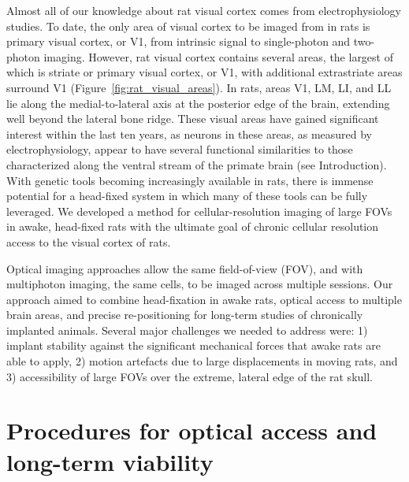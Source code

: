 Almost all of our knowledge about rat visual cortex comes from electrophysiology studies. To date, the only area of visual cortex to be imaged from in rats is primary visual cortex, or V1, from intrinsic signal \cite{Gias2004} to single-photon \cite{Scott2018ImagingMacroscope} and two-photon \cite{Ohki2005, Greenberg2008} imaging. However, rat visual cortex contains several areas, the largest of which is striate or primary visual cortex, or V1, with additional extrastriate areas surround V1 \cite{Espinoza1983RetinotopicRat, Sereno1991} (Figure~\ref{fig:rat_visual_areas}). In rats, areas V1, LM, LI, and LL lie along the medial-to-lateral axis at the posterior edge of the brain, extending well beyond the lateral bone ridge. These visual areas have gained significant interest within the last ten years, as neurons in these areas, as measured by electrophysiology, appear to have several functional similarities to those characterized along the ventral stream of the primate brain (see Introduction). With genetic tools becoming increasingly available in rats, there is immense potential for a head-fixed system in which many of these tools can be fully leveraged. We developed a method for cellular-resolution imaging of large FOVs in awake, head-fixed rats with the ultimate goal of chronic cellular resolution access to the visual cortex of rats. 

Optical imaging approaches allow the same field-of-view (FOV), and with multiphoton imaging, the same cells, to be imaged across multiple sessions. Our approach aimed to combine head-fixation in awake rats, optical access to multiple brain areas, and precise re-positioning for long-term studies of chronically implanted animals. Several major challenges we needed to address were:  1) implant stability against the significant mechanical forces that awake rats are able to apply, 2) motion artefacts due to large displacements in moving rats, and 3) accessibility of large FOVs over the extreme, lateral edge of the rat skull.


\section{Procedures for optical access and long-term viability} 

